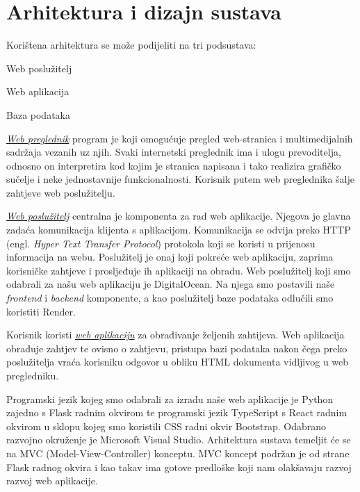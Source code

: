 \chapter{Arhitektura i dizajn sustava}
		
		Korištena arhitektura se može podijeliti na tri podsustava:
		    \begin{packed_item}
		        \item Web poslužitelj
    		    \item Web aplikacija
    		    \item Baza podataka
		    \end{packed_item}
		    
	    \underline{\textit{Web preglednik}} program je koji omogućuje pregled web-stranica i multimedijalnih sadržaja vezanih uz njih. Svaki internetski preglednik ima i ulogu prevoditelja, odnosno on interpretira kod kojim je stranica napisana i tako realizira grafičko sučelje i neke jednostavnije funkcionalnosti. Korisnik putem web preglednika šalje zahtjeve web poslužitelju.
	    
	    \underline{\textit{Web poslužitelj}} centralna je komponenta za rad web aplikacije. Njegova je glavna zadaća komunikacija klijenta s aplikacijom. Komunikacija se odvija preko HTTP (engl. \textit{Hyper Text Transfer Protocol}) protokola koji se koristi u prijenosu informacija na webu. Poslužitelj je onaj koji pokreće web aplikaciju, zaprima korisničke zahtjeve i prosljeđuje ih aplikaciji na obradu. Web poslužitelj koji smo odabrali za našu web aplikaciju je DigitalOcean. Na njega smo postavili naše \textit{frontend} i \textit{backend} komponente, a kao poslužitelj baze podataka odlučili smo koristiti Render.

	    Korisnik koristi \underline{\textit{web aplikaciju}} za obrađivanje željenih zahtijeva. Web aplikacija obrađuje zahtjev te ovisno o zahtjevu, pristupa bazi podataka nakon čega preko poslužitelja vraća korisniku odgovor u obliku HTML dokumenta vidljivog u web pregledniku.
		
		Programski jezik kojeg smo odabrali za izradu naše web aplikacije je Python zajedno s Flask radnim okvirom te programski jezik TypeScript s React radnim okvirom u sklopu kojeg smo koristili CSS radni okvir Bootstrap. Odabrano razvojno okruženje je Microsoft Visual Studio. Arhitektura sustava temeljit će se na MVC (Model-View-Controller) konceptu. MVC koncept podržan je od strane Flask radnog okvira i kao takav ima gotove predloške koji nam olakšavaju razvoj razvoj web aplikacije.
		
